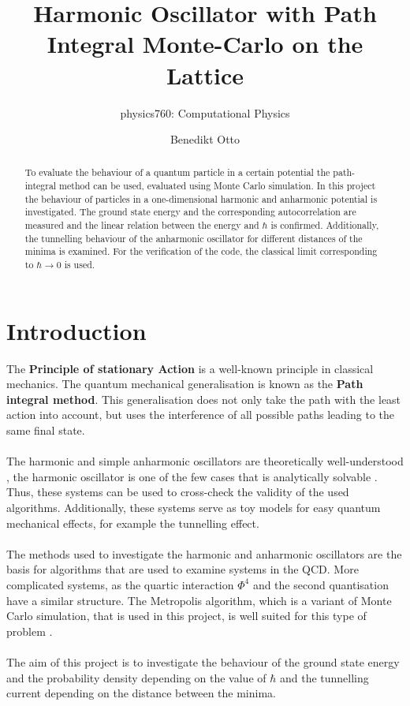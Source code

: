 \documentclass{scrartcl}
\title{Harmonic Oscillator with Path Integral Monte-Carlo on the Lattice}
\author{Benedikt Otto}
\subtitle{physics760: Computational Physics}
\begin{document}
	\maketitle

	\newpage

	\tableofcontents

	\newpage


	\begin{abstract}
		To evaluate the behaviour of a quantum particle in a certain potential the path-integral method can be used, evaluated using Monte Carlo simulation.
		In this project the behaviour of particles in a one-dimensional harmonic and anharmonic potential is investigated.
		The ground state energy and the corresponding autocorrelation are measured and the linear relation between the energy and $\hbar$ is confirmed.
		Additionally, the tunnelling behaviour of the anharmonic oscillator for different distances of the minima is examined.
		For the verification of the code, the classical limit corresponding to $\hbar \rightarrow 0$ is used.
	\end{abstract}

	\section{Introduction}
		The \textbf{Principle of stationary Action} is a well-known principle in classical mechanics.
		The quantum mechanical generalisation is known as the \textbf{Path integral method}.
		This generalisation does not only take the path with the least action into account, but uses the interference of all possible paths leading to the same final state.
		\\\\
		The harmonic and simple anharmonic oscillators are theoretically well-understood \cite{bender}, the harmonic oscillator is one of the few cases that is analytically solvable \cite{rushka_freericks}.
		Thus, these systems can be used to cross-check the validity of the used algorithms.
		Additionally, these systems serve as toy models for easy quantum mechanical effects, for example the tunnelling effect.
		\\\\
		The methods used to investigate the harmonic and anharmonic oscillators are the basis for algorithms that are used to examine systems in the QCD.
		More complicated systems, as the quartic interaction $\Phi^4$ and the second quantisation have a similar structure.
		The Metropolis algorithm, which is a variant of Monte Carlo simulation, that is used in this project, is well suited for this type of problem \cite{creutz_freedman, rodgers_raes}.
		\\\\
		The aim of this project is to investigate the behaviour of the ground state energy and the probability density depending on the value of $\hbar$ and the tunnelling current depending on the distance between the minima.
\end{document}
